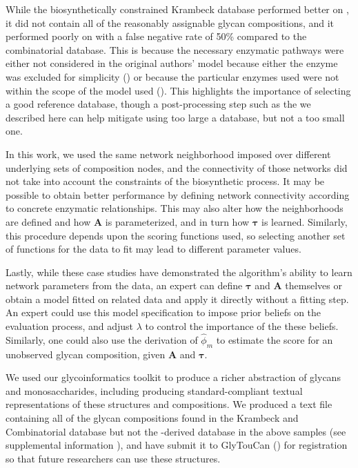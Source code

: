     While the biosynthetically constrained Krambeck database performed better on \rpserum,
    it did not contain all of the reasonably assignable glycan compositions, and it performed
    poorly on \philbs with a false negative rate of 50\% compared to the combinatorial database.
    This is because the necessary enzymatic pathways were either not considered in the original
    authors' model because either the enzyme was excluded for simplicity (\cite{Krambeck2009}) or
    because the particular enzymes used were not within the scope of the model used
    (\cite{Spiro2000,Ichimiya2014}). This highlights the importance of selecting a good reference
    database, though a post-processing step such as the we described here can help mitigate using
    too large a database, but not a too small one.

    In this work, we used the same network neighborhood imposed over different underlying sets of
    composition nodes, and the connectivity of those networks did not take into account the constraints
    of the biosynthetic process. It may be possible to obtain better performance by defining network
    connectivity according to concrete enzymatic relationships. This may also alter how the neighborhoods
    are defined and how $\mathbf{A}$ is parameterized, and in turn how $\mathbf{\tau}$ is learned.
    Similarly, this procedure depends upon the scoring functions used, so selecting another set of
    functions for the data to fit may lead to different parameter values.

    Lastly, while these case studies have demonstrated the algorithm's ability to learn network parameters
    from the data, an expert can define $\mathbf{\tau}$ and $\mathbf{A}$ themselves or obtain a model fitted
    on related data and apply it directly without a fitting step. An expert could use this model specification
    to impose prior beliefs on the evaluation process, and adjust $\lambda$ to control the importance of
    the these beliefs. Similarly, one could also use the derivation of ${\hat \phi_m}$ to estimate the score
    for an unobserved glycan composition, given $\mathbf{A}$ and $\mathbf{\tau}$.

    We used our glycoinformatics toolkit to produce a richer abstraction of glycans and monosaccharides,
    including producing standard-compliant textual representations of these structures and compositions.
    We produced a text file containing all of the glycan compositions found in the Krambeck and Combinatorial
    database but not the \glyspace-derived database in the above samples (see supplemental information
    ),
    and have submit it to GlyTouCan (\cite{Tiemeyer2017}) for registration so that future researchers can
    use these structures.

